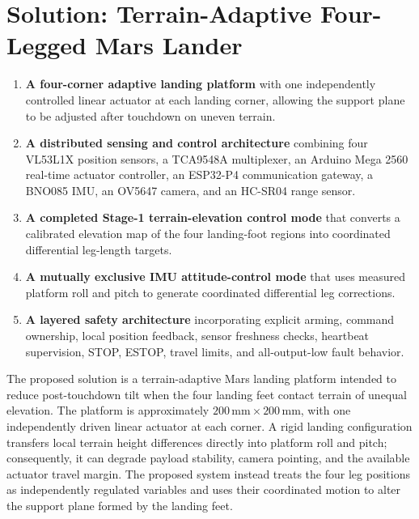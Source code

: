 
\section{Solution: Terrain-Adaptive Four-Legged Mars Lander}

\begin{enumerate}
    \item \textbf{A four-corner adaptive landing platform} with one independently controlled linear actuator at each landing corner, allowing the support plane to be adjusted after touchdown on uneven terrain.
    \item \textbf{A distributed sensing and control architecture} combining four VL53L1X position sensors, a TCA9548A multiplexer, an Arduino Mega 2560 real-time actuator controller, an ESP32-P4 communication gateway, a BNO085 IMU, an OV5647 camera, and an HC-SR04 range sensor.
    \item \textbf{A completed Stage-1 terrain-elevation control mode} that converts a calibrated elevation map of the four landing-foot regions into coordinated differential leg-length targets.
    \item \textbf{A mutually exclusive IMU attitude-control mode} that uses measured platform roll and pitch to generate coordinated differential leg corrections.
    \item \textbf{A layered safety architecture} incorporating explicit arming, command ownership, local position feedback, sensor freshness checks, heartbeat supervision, STOP, ESTOP, travel limits, and all-output-low fault behavior.
\end{enumerate}

The proposed solution is a terrain-adaptive Mars landing platform intended to reduce post-touchdown tilt when the four landing feet contact terrain of unequal elevation. The platform is approximately $200\,\mathrm{mm}\times200\,\mathrm{mm}$, with one independently driven linear actuator at each corner. A rigid landing configuration transfers local terrain height differences directly into platform roll and pitch; consequently, it can degrade payload stability, camera pointing, and the available actuator travel margin. The proposed system instead treats the four leg positions as independently regulated variables and uses their coordinated motion to alter the support plane formed by the landing feet.

